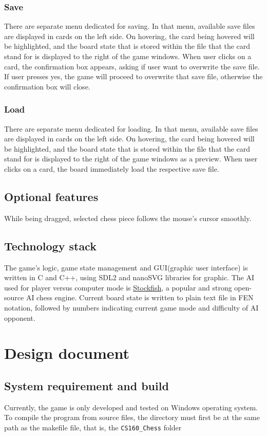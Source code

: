 \documentclass[a4paper, 10pt, titlepage]{report}
\begin{document}
\subsection{Save}
There are separate menu dedicated for saving. In that menu, available save files are displayed in cards on the left side. On hovering, the card being hovered will be highlighted, and the board state that is stored within the file that the card stand for is displayed to the right of the game windows. When user clicks on a card, the confirmation box appears, asking if user want to overwrite the save file. If user presses yes, the game will proceed to overwrite that save file, otherwise the confirmation box will close.

\subsection{Load}
There are separate menu dedicated for loading. In that menu, available save files are displayed in cards on the left side. On hovering, the card being hovered will be highlighted, and the board state that is stored within the file that the card stand for is displayed to the right of the game windows as a preview. When user clicks on a card, the board immediately load the respective save file.
\section{Optional features}
While being dragged, selected chess piece follows the mouse's cursor smoothly.
\section{Technology stack}
The game's logic, game state management and GUI(graphic user interface) is written in C and C++, using SDL2 and nanoSVG libraries for graphic. The AI used for player versus computer mode is \href{https://github.com/official-stockfish/Stockfish}{Stockfish}, a popular and strong open-source AI chess engine. Current board state is written to plain text file in FEN notation, followed by numbers indicating current game mode and difficulty of AI opponent. 
\chapter{Design document}
\section{System requirement and build}
Currently, the game is only developed and tested on Windows operating system.
To compile the program from source files, the directory must first be at the same path as the makefile file, that is, the \texttt{CS160\_Chess} folder
\end{document}
